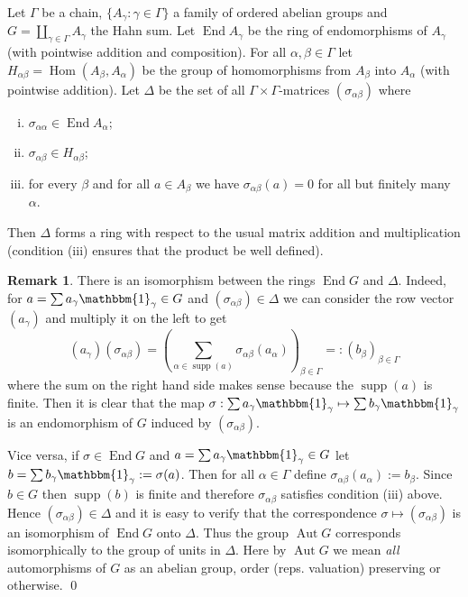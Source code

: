 \documentclass[12pt,a4paper,reqno,openright]{amsart}
\renewcommand{\1}{\mathbbm{1}}
\DeclareMathOperator{\Aut}{Aut}
\DeclareMathOperator{\Hom}{Hom}
\DeclareMathOperator{\End}{End}
\DeclareMathOperator*\supp{supp}
\theoremstyle{definition}
\theoremstyle{plain}
\theoremstyle{plain}
\theoremstyle{plain}
\theoremstyle{plain}
\theoremstyle{plain}
\theoremstyle{plain}
\theoremstyle{plain}
\theoremstyle{plain}
\theoremstyle{definition}
\theoremstyle{definition}
\theoremstyle{plain}
\theoremstyle{definition}
\theoremstyle{definition}
\newtheorem{rmk}[defn]{Remark}
\theoremstyle{plain}
\theoremstyle{plain}
\theoremstyle{plain}
\begin{document}
Let $ \Gamma $ be a chain, $ \{A_\gamma:\gamma\in\Gamma\} $ a family of ordered abelian groups and $ G = \coprod_{\gamma\in\Gamma}A_\gamma $ the Hahn sum. Let $ \End A_\gamma $ be the ring of endomorphisms of $ A_\gamma $ (with pointwise addition and composition). For all $ \alpha,\beta\in\Gamma $ let $ H_{\alpha\beta} = \Hom(A_\beta,A_\alpha) $ be the group of homomorphisms from $ A_\beta $ into $ A_\alpha$ (with pointwise addition). Let $ \Delta $ be the set of all $ \Gamma{\times}\Gamma $-matrices $ (\sigma_{\alpha\beta}) $ where
\begin{enumerate}[(i)]
	\item $ \sigma_{\alpha\alpha}\in\End A_\alpha $;
	\item $ \sigma_{\alpha\beta}\in H_{\alpha\beta} $;
	\item for every $ \beta $ and for all $ a\in A_\beta $ we have $ \sigma_{\alpha\beta}(a)=0 $ for all but finitely many $ \alpha $.
\end{enumerate}
Then $ \Delta $ forms a ring with respect to the usual matrix addition and multiplication (condition (iii) ensures that the product be well defined).
\begin{rmk}\label{rmk:isom-End-Delta}
There is an isomorphism between the rings $ \End G $ and $\Delta $.
Indeed, for $ a=\sum a_\gamma\1_\gamma\in G $ and $ (\sigma_{\alpha\beta})\in\Delta $ we can consider the row vector $ (a_\gamma) $ and multiply it on the left to get
\begin{equation}\label{eq:formula-matrix-multiplication}
(a_\gamma)(\sigma_{\alpha\beta}) = \left(\sum_{\alpha\in\supp(a)} \sigma_{\alpha\beta}(a_\alpha)\right)_{\beta\in\Gamma} =: (b_\beta)_{\beta\in\Gamma}
\end{equation}
where the sum on the right hand side makes sense because the $ \supp (a) $ is finite.
Then it is clear that the map $ \sigma: \sum a_\gamma\1_\gamma\mapsto \sum b_\gamma\1_\gamma $ is an endomorphism of $ G $ induced by $ (\sigma_{\alpha\beta}) $.

Vice versa, if $ \sigma\in\End G $ and $ a=\sum a_\gamma\1_\gamma\in G $
let $ b=\sum b_\gamma\1_\gamma := \sigma(a) $. Then for all $
\alpha\in\Gamma $ define $ \sigma_{\alpha\beta}(a_\alpha):= b_\beta $.
Since $ b\in G $ then $ \supp (b) $ is finite and therefore $
\sigma_{\alpha\beta} $ satisfies condition (iii) above. Hence $ (\sigma_{\alpha\beta})\in \Delta $ and it is easy to verify that the correspondence $ \sigma \mapsto (\sigma_{\alpha\beta}) $ is an isomorphism of $ \End G $ onto $ \Delta $.
Thus the group $ \Aut G $ corresponds isomorphically to the group of units in $ \Delta $. Here by $ \Aut G $ we mean \emph{all} automorphisms of $ G $ as an abelian group, order (reps. valuation) preserving or otherwise. \qed
\end{rmk}
\end{document}
